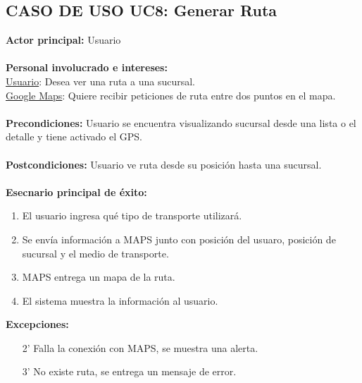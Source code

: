 \documentclass[12pt]{article}
\begin{document}
\subsection{\textbf{CASO DE USO UC8:} Generar Ruta }
\textbf{Actor principal:} Usuario\\
\\
\textbf{Personal involucrado e intereses:}\\
\underline{Usuario}: Desea ver una ruta a una sucursal.\\
\underline{Google Maps}: Quiere recibir peticiones de ruta entre dos puntos en el mapa.
\\\\
\textbf{Precondiciones:} Usuario se encuentra visualizando sucursal desde una lista o el detalle y tiene activado el GPS.\\
\\
\textbf{Postcondiciones:} Usuario ve ruta desde su posición hasta una sucursal.\\
\\
\textbf{Esecnario principal de éxito:}
\begin{enumerate}
\item El usuario ingresa qué tipo de transporte utilizará.
\item Se envía información a MAPS junto con posición del usuaro, posición de sucursal y el medio de transporte.
\item MAPS entrega un mapa de la ruta.
\item El sistema muestra la información al usuario.
\end{enumerate}
\textbf{Excepciones:}
\begin{enumerate}
\item[2'] Falla la conexión con MAPS, se muestra una alerta.
\item[3'] No existe ruta, se entrega un mensaje de error.
\end{enumerate}
\newpage
\end{document}
